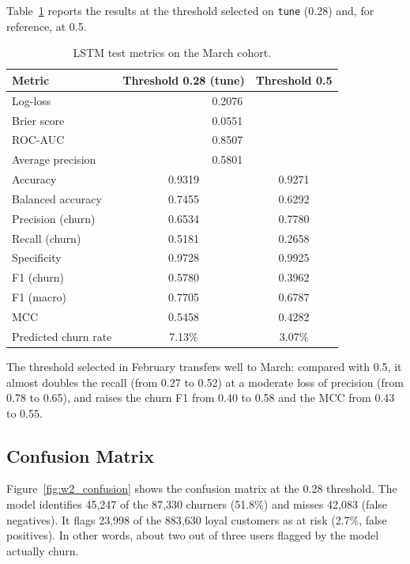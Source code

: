 \documentclass{article}
\begin{document}
Table~\ref{tab:w2_test} reports the results at the threshold selected on \texttt{tune} (0.28) and, for reference, at 0.5.

\begin{table}[H]
\centering
\renewcommand{\arraystretch}{1.3}
\begin{tabular}{|l|c|c|}
\hline
\textbf{Metric} & \textbf{Threshold 0.28 (tune)} & \textbf{Threshold 0.5} \\ \hline
Log-loss            & \multicolumn{2}{c|}{0.2076} \\ \hline
Brier score         & \multicolumn{2}{c|}{0.0551} \\ \hline
ROC-AUC             & \multicolumn{2}{c|}{0.8507} \\ \hline
Average precision   & \multicolumn{2}{c|}{0.5801} \\ \hline
Accuracy            & 0.9319 & 0.9271 \\ \hline
Balanced accuracy   & 0.7455 & 0.6292 \\ \hline
Precision (churn)   & 0.6534 & 0.7780 \\ \hline
Recall (churn)      & 0.5181 & 0.2658 \\ \hline
Specificity         & 0.9728 & 0.9925 \\ \hline
F1 (churn)          & 0.5780 & 0.3962 \\ \hline
F1 (macro)          & 0.7705 & 0.6787 \\ \hline
MCC                 & 0.5458 & 0.4282 \\ \hline
Predicted churn rate & 7.13\% & 3.07\% \\ \hline
\end{tabular}
\caption{LSTM test metrics on the March cohort.}
\label{tab:w2_test}
\end{table}

The threshold selected in February transfers well to March: compared with 0.5, it almost doubles the recall (from 0.27 to 0.52) at a moderate loss of precision (from 0.78 to 0.65), and raises the churn F1 from 0.40 to 0.58 and the MCC from 0.43 to 0.55.

\subsection{Confusion Matrix}

Figure~\ref{fig:w2_confusion} shows the confusion matrix at the 0.28 threshold. The model identifies 45{,}247 of the 87{,}330 churners (51.8\%) and misses 42{,}083 (false negatives). It flags 23{,}998 of the 883{,}630 loyal customers as at risk (2.7\%, false positives). In other words, about two out of three users flagged by the model actually churn.
\end{document}
